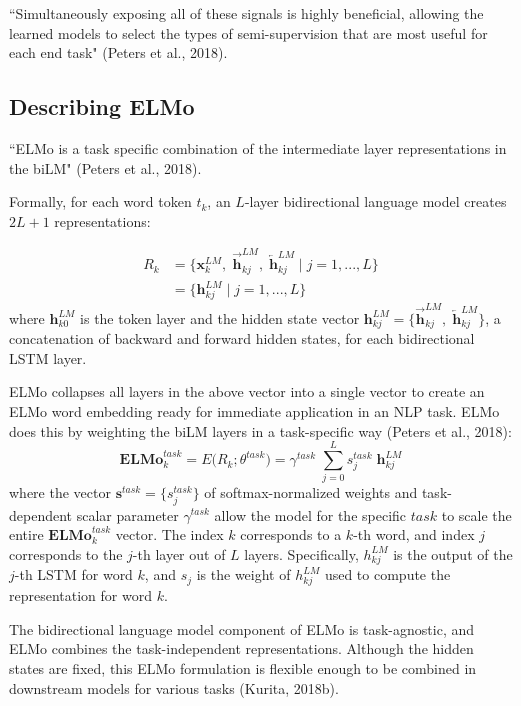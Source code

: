 ``Simultaneously exposing all of these signals is highly beneficial, allowing the learned models to select the types of semi-supervision that are most useful for each end task" (Peters et al., 2018). 


\subsection{Describing ELMo} 

``ELMo is a task specific combination of the intermediate layer representations in the biLM" (Peters et al., 2018). 

Formally, for each word token $t_k$, an $L$-layer bidirectional language model creates $2L + 1$ representations: 

$$
\begin{array}{ll}
R_k 
&= \Big \{ \mathbf{x}_k^{LM}, \; \overrightarrow{\mathbf{h}}_{kj}^{LM}, \; \overleftarrow{\mathbf{h}}_{kj}^{LM} \; | \; j = 1,...,L \Big \} \\
&= \Big \{ \mathbf{h}_{kj}^{LM} \; | \; j = 1,...,L \Big \}
\end{array}
$$
where $\mathbf{h}_{k0}^{LM}$ is the token layer and the hidden state vector $\mathbf{h}_{kj}^{LM} = \Big \{ \overrightarrow{\mathbf{h}}_{kj}^{LM}, \; \overleftarrow{\mathbf{h}}_{kj}^{LM}  \}$, a concatenation of backward and forward hidden states, for each bidirectional LSTM layer. 

ELMo collapses all layers in the above vector into a single vector to create an ELMo word embedding ready for immediate application in an NLP task. ELMo does this by weighting the biLM layers in a task-specific way (Peters et al., 2018): 
$$
\textbf{ELMo}_k^{task} = E \Big( R_k; \theta^{task} \Big) = \gamma^{task} \; \sum_{j=0}^L s_j^{task} \; \mathbf{h}_{kj}^{LM}
$$
where the vector $\mathbf{s}^{task} = \Big\{ s_j^{task} \Big\}$ of softmax-normalized weights and task-dependent scalar parameter $\gamma^{task}$ allow the model for the specific $task$ to scale the entire $\textbf{ELMo}_k^{task}$ vector. The index $k$ corresponds to a $k$-th word, and index $j$ corresponds to the $j$-th layer out of $L$ layers. Specifically, $h_{kj}^{LM}$ is the output of the $j$-th LSTM for word $k$, and $s_j$ is the weight of $h_{kj}^{LM}$ used to compute the representation for word $k$. 

The bidirectional language model component of ELMo is task-agnostic, and ELMo combines the task-independent representations. Although the hidden states are fixed, this ELMo formulation is flexible enough to be combined in downstream models for various tasks (Kurita, 2018b). 

